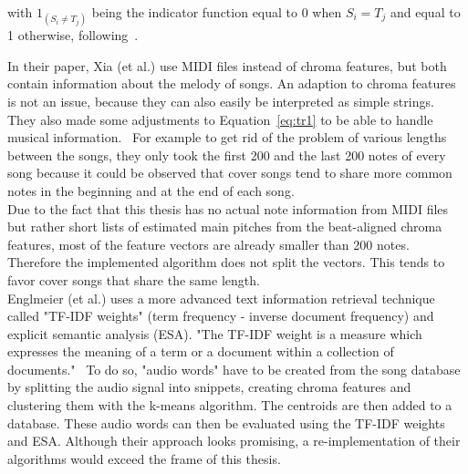 \noindent with $1_{(S_i \neq T_j)}$ being the indicator function equal to 0 when $S_{i} = T_{j}$ and equal to 1 otherwise, following~\cite[p. 7]{chroma4}.

\noindent In their paper, Xia (et al.) use MIDI files instead of chroma features, but both contain information about the melody of songs. An adaption to chroma features is not an issue, because they can also easily be interpreted as simple strings. 
\noindent They also made some adjustments to Equation~\ref{eq:tr1} to be able to handle musical information.~\cite[pp. 7ff]{chroma4} For example to get rid of the problem of various lengths between the songs, they only took the first 200 and the last 200 notes of every song because it could be observed that cover songs tend to share more common notes in the beginning and at the end of each song.\\
Due to the fact that this thesis has no actual note information from MIDI files but rather short lists of estimated main pitches from the beat-aligned chroma features, most of the feature vectors are already smaller than 200 notes. Therefore the implemented algorithm does not split the vectors. This tends to favor cover songs that share the same length. 
\ \\
Englmeier (et al.) uses a more advanced text information retrieval technique called "TF-IDF weights" (term frequency - inverse document frequency) and explicit semantic analysis (ESA). "The TF-IDF weight is a measure which expresses the meaning of a term or a document within a collection of documents."~\cite[p. 186]{chroma1}
To do so, "audio words" have to be created from the song database by splitting the audio signal into snippets, creating chroma features and clustering them with the k-means algorithm. The centroids are then added to a database. These audio words can then be evaluated using the TF-IDF weights and ESA.
Although their approach looks promising, a re-implementation of their algorithms would exceed the frame of this thesis.

